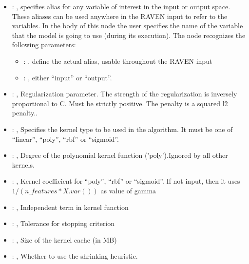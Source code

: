 \begin{itemize}
    \item {}: , 
      specifies alias for         any variable of interest in the input or output space. These
      aliases can be used anywhere in the RAVEN input to         refer to the variables. In the body
      of this node the user specifies the name of the variable that the model is going to use
      (during its execution).
      The  node recognizes the following parameters:
        \begin{itemize}
          \item {}: , 
            define the actual alias, usable throughout the RAVEN input
          \item {}: , 
            either ``input'' or ``output''.
      \end{itemize}

    \item {}: , 
      Regularization parameter. The strength of the regularization is inversely
      proportional to C.                                                            Must be strictly
      positive. The penalty is a squared l2 penalty..

    \item {}: , 
      Specifies the kernel type to be used in the algorithm. It must be one of
      ``linear'', ``poly'', ``rbf'' or ``sigmoid''.

    \item {}: , 
      Degree of the polynomial kernel function ('poly').Ignored by all other kernels.

    \item {}: , 
      Kernel coefficient for ``poly'', ``rbf'' or ``sigmoid''. If not input, then it uses
      $1 / (n\_features * X.var())$ as value of gamma

    \item {}: , 
      Independent term in kernel function

    \item {}: , 
      Tolerance for stopping criterion

    \item {}: , 
      Size of the kernel cache (in MB)

    \item {}: , 
      Whether to use the shrinking heuristic.


\end{itemize}
